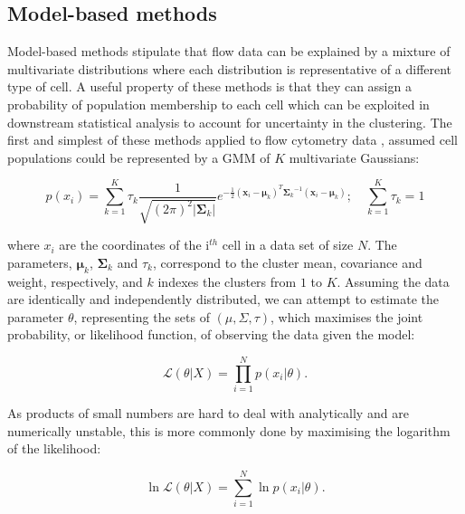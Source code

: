 \subsection{Model-based methods}

Model-based methods stipulate that flow data can be explained by a mixture of multivariate distributions where each distribution is representative of a different type of cell.
A useful property of these methods is that they can assign a probability of population membership to each cell which can be exploited in downstream statistical analysis to account for uncertainty in the clustering.
The first and simplest of these methods applied to flow cytometry data \citep{Chan:2008gq}, assumed cell populations could be represented by
a \acrfull{GMM} of $K$ multivariate Gaussians:

\[
p(x_i) = \sum_{k=1}^K\tau_k \frac{1}{\sqrt{(2\pi)^2|\boldsymbol\Sigma_k|}}
e^{-\frac{1}{2}({\mathbf x_i}-{\boldsymbol\mu_k})^T{\boldsymbol\Sigma_k}^{-1}({\mathbf x_i}-{\boldsymbol\mu_k})
}; \quad \sum_{k=1}^K\tau_k = 1
\]

where $x_i$ are the coordinates of the i$^{th}$ cell in a data set of size $N$.
The parameters, $\boldsymbol\mu_k$, $\boldsymbol\Sigma_k$ and $\tau_k$,
correspond to the cluster mean, covariance and weight, respectively, and $k$ indexes the clusters from $1$ to $K$.
Assuming the data are identically and independently distributed, we can attempt to estimate
the parameter $\theta$, representing the sets of $(\mu, \Sigma, \tau)$, which maximises the joint probability,
or likelihood function, of observing the data given the model:

\[
\mathcal{L}(\theta |X) = \prod_{i=1}^N p(x_i|\theta).
\]


As products of small numbers are hard to deal with analytically and are numerically unstable,
this is more commonly done by maximising the logarithm of the likelihood:


\[
\ln \mathcal{L}(\theta |X) = \sum_{i=1}^N \ln p(x_i|\theta).
\]

